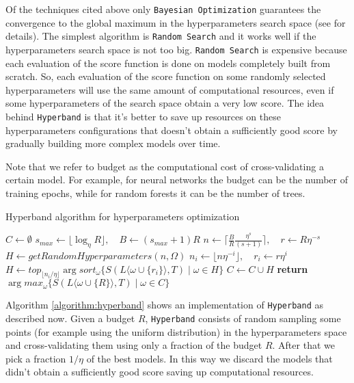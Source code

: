 \documentclass[11pt, a4paper]{article}
\begin{document}
  Of the techniques cited above only \texttt{Bayesian Optimization} guarantees the convergence to the global maximum in the hyperparameters search space (see \cite{bayesianoptimization} for details).
  The simplest algorithm is \texttt{Random Search} and it works well if the hyperparameters search space is not too big.
  \texttt{Random Search} is expensive because each evaluation of the score function is done on models completely built from scratch.
  So, each evaluation of the score function on some randomly selected hyperparameters will use the same amount of computational resources, even if some hyperparameters of the search space obtain a very low score.
  The idea behind \texttt{Hyperband} is that it's better to save up resources on these hyperparameters configurations that doesn't obtain a sufficiently good score by gradually building more complex models over time.
  
  Note that we refer to budget as the computational cost of cross-validating a certain model.
  For example, for neural networks the budget can be the number of training epochs, while for random forests it can be the number of trees.

  \begin{algorithm}
    \caption{Hyperband algorithm for hyperparameters optimization}
    \label{algorithm:hyperband}
    \begin{algorithmic}[1]
        \State $C \gets \emptyset$
        \State $s_{max} \gets \lfloor \log_{\eta}{R} \rfloor, \quad B \gets (s_{max} + 1)R$
          \State $n \gets \lceil \frac{B}{R}\frac{\eta^{s}}{(s+1)} \rceil, \quad r \gets R\eta^{-s}$
          \State $H \gets getRandomHyperparameters(n,\Omega)$
            \State $n_{i} \gets \lfloor n\eta^{-i} \rfloor, \quad r_{i} \gets r\eta^{i}$
            \State $H \gets top_{\lfloor n_{i}/\eta \rfloor} \arg sort_{\omega} \{S(L\langle\omega \cup \{r_{i}\}\rangle, T) \mid \omega \in H\}$
          \EndFor
          \State $C \gets C \cup H$
        \EndFor
        \State \textbf{return} $\arg max_{\omega} \{S(L\langle\omega \cup \{R\}\rangle, T) \mid \omega \in C\}$
      \EndProcedure
    \end{algorithmic}
  \end{algorithm}

  Algorithm \ref{algorithm:hyperband} shows an implementation of \texttt{Hyperband} as described now.
  Given a budget $R$, \texttt{Hyperband} consists of random sampling some points (for example using the uniform distribution) in the hyperparameters space and cross-validating them using only a fraction of the budget $R$.
  After that we pick a fraction $1/\eta$ of the best models.
  In this way we discard the models that didn't obtain a sufficiently good score saving up computational resources.
\end{document}
